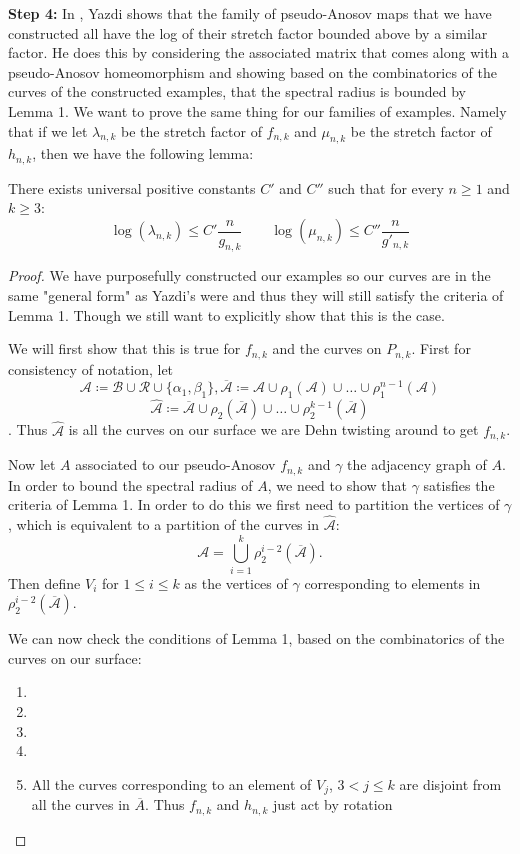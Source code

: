 \textbf{Step 4:} In \cite{yazdi2018pseudo}, Yazdi shows that the family of pseudo-Anosov maps that we have constructed all have the log of their stretch factor bounded above by a similar factor. He does this by considering the associated matrix that comes along with a pseudo-Anosov homeomorphism and showing based on the combinatorics of the curves of the constructed examples, that the spectral radius is bounded by Lemma 1. We want to prove the same thing for our families of examples. Namely that if we let $\lambda_{n,k}$ be the stretch factor of $f_{n,k}$ and $\mu_{n,k}$ be the stretch factor of $h_{n,k}$, then we have the following lemma: 
\begin{lem}
There exists universal positive constants $C'$ and $C''$ such that for every $n \geq 1$ and $k \geq 3$:
$$\log(\lambda_{n,k}) \leq C'\frac{n}{g_{n,k}} \hspace{2em} \log(\mu_{n,k}) \leq C''\frac{n}{g'_{n,k}}$$
\end{lem}
\begin{proof}
We have purposefully constructed our examples so our curves are in the same "general form" as Yazdi's were and thus they will still satisfy the criteria of Lemma 1. Though we still want to explicitly show that this is the case.

We will first show that this is true for $f_{n,k}$ and the curves on $P_{n,k}$. First for consistency of notation, let
$$\mathcal{A} \coloneqq \mathcal{B} \cup \mathcal{R} \cup \{\alpha_1,\beta_1\}, \overline{\mathcal{A}} \coloneqq \mathcal{A} \cup \rho_1(\mathcal{A}) \cup \dots \cup \rho_1^{n-1}(\mathcal{A})$$
$$\hat{\mathcal{A}} \coloneqq \overline{\mathcal{A}} \cup \rho_2(\overline{\mathcal{A}}) \cup \dots \cup \rho_2^{k-1}(\overline{\mathcal{A}})$$. Thus $\hat{\mathcal{A}}$ is all the curves on our surface we are Dehn twisting around to get $f_{n,k}$. 

Now let $A$ associated to our pseudo-Anosov $f_{n,k}$ and $\gamma$ the adjacency graph of $A$. In order to bound the spectral radius of $A$, we need to show that $\gamma$ satisfies the criteria of Lemma 1. In order to do this we first need to partition the vertices of $\gamma$, which is equivalent to a partition of the curves in $\hat{\mathcal{A}}$: $$\mathcal{A} = \bigcup_{i=1}^k \rho_2^{i-2}(\overline{\mathcal{A}}).$$ Then define $V_i$ for $1 \leq i \leq k$ as the vertices of $\gamma$ corresponding to elements in $\rho_2^{i-2}(\overline{\mathcal{A}})$.

We can now check the conditions of Lemma 1, based on the combinatorics of the curves on our surface:
\begin{enumerate}
    \item 
    \item 
    \item 
    \item 
    \item All the curves corresponding to an element of $V_j$, $3 < j \leq k$ are disjoint from all the curves in $\overline{A}$. Thus $f_{n,k}$ and $h_{n,k}$ just act by rotation
\end{enumerate}

\end{proof}

